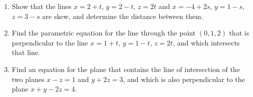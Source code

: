 \documentclass[12pt]{article}
\begin{document}
\begin{enumerate}
\item   Show that the lines $x=2+t$, $y=2-t$, $z=2t$ and  $x=-4+2s$, $y=1-s$, $z=3-s$ are skew, and determine the distance between them.  

\item  Find the parametric equation for the line through the point $(0,1,2)$ that is perpendicular to the line $x=1+t$,
  $y=1-t$, $z=2t$, and which intersects that line.

\item   Find an equation for  the plane that contains the line of intersection of the two planes
  $x-z=1$ and $y+2z=3$, and which is also perpendicular to the plane $x+y-2z=4$.



\end{enumerate}  
\end{document}
